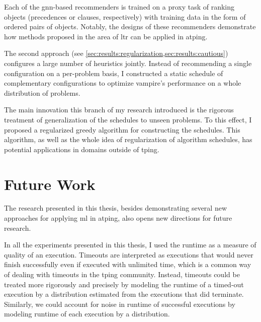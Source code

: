 Each of the \acrshort{gnn}-based recommenders is trained on a proxy task of ranking objects (precedences or clauses, respectively)
with training data in the form of ordered pairs of objects.
Notably, the designs of these recommenders demonstrate how methods proposed in the area of \acrlong{ltr}
can be applied in \gls{atping}.

The second approach (see \cref{sec:results:regularization,sec:results:cautious}) configures a large number of heuristics jointly.
Instead of recommending a single configuration on a per-problem basis,
I constructed a static schedule of complementary configurations to optimize \gls{vampire}'s performance on a whole distribution of problems.

The main innovation this branch of my research introduced is the rigorous treatment of generalization of the schedules to unseen problems.
To this effect, I proposed a regularized greedy algorithm for constructing the schedules.
This algorithm, as well as the whole idea of regularization of algorithm schedules, has potential applications in domains outside of \gls{tping}.


\section{Future Work}


The research presented in this thesis,
besides demonstrating several new approaches for applying \gls{ml} in \gls{atping},
also opens new directions for future research.

In all the experiments presented in this thesis, I used the runtime as a measure of quality of an execution.
Timeouts are interpreted as executions that would never finish successfully even if executed with unlimited time, which is a common way of dealing with timeouts in the \gls{tping} community.
Instead, timeouts could be treated more rigorously and precisely by modeling the runtime of a timed-out execution by a distribution estimated from the executions that did terminate.
Similarly, we could account for noise in runtime of successful executions by modeling runtime of each execution by a distribution.

